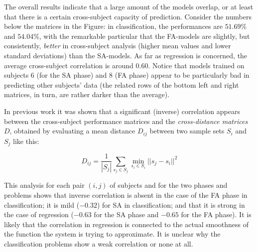 \documentclass[10pt]{bmc_article}
\def\texttt{[image: ]}
\newenvironment{bmcformat}{\begin{raggedright}\baselineskip20pt\sloppy\setboolean{publ}{false}}{\end{raggedright}\baselineskip20pt\sloppy}
\begin{document}
\begin{bmcformat}

The overall results indicate that a large amount of the models
overlap, or at least that there is a certain cross-subject capacity of
prediction. Consider the numbers below the matrices in the Figure: in
classification, the performances are $51.69\%$ and $54.04\%$, with the
remarkable particular that the FA-models are slightly, but
consistently, \emph{better} in cross-subject analysis (higher mean
values and lower standard deviations) than the SA-models. As far as
regression is concerned, the average cross-subject correlation is
around $0.60$. Notice that models trained
on subjects $6$ (for the SA phase) and $8$ (FA phase) appear to be
particularly bad in predicting other subjects' data (the related rows
of the bottom left and right matrices, in turn, are rather darker than
the average).

In previous work it was shown that a significant (inverse) correlation
appears between the cross-subject performance matrices and the
\emph{cross-distance matrices} $D$,
obtained by evaluating a mean distance $D_{ij}$ between
two sample sets $S_i$ and $S_j$ like this:

$$ D_{ij} = \frac{1}{|S_j|} \sum_{s_j \in S_j}{\min_{s_i \in S_i}{ ||s_j-s_i||^2 } } $$

This analysis for each pair $(i,j)$ of subjects and for
the two phases and problems shows that inverse correlation
is absent in the case of the FA phase in classification; it is mild
($-0.32$) for SA in classification; and that it is strong in the case
of regression ($-0.63$ for the SA phase and $-0.65$ for the FA
phase). It is likely that the correlation in regression is connected
to the actual smoothness of the function the system is trying to
approximate. It is unclear why the classification problems show a
weak correlation or none at all.


\end{bmcformat}
\end{document}
